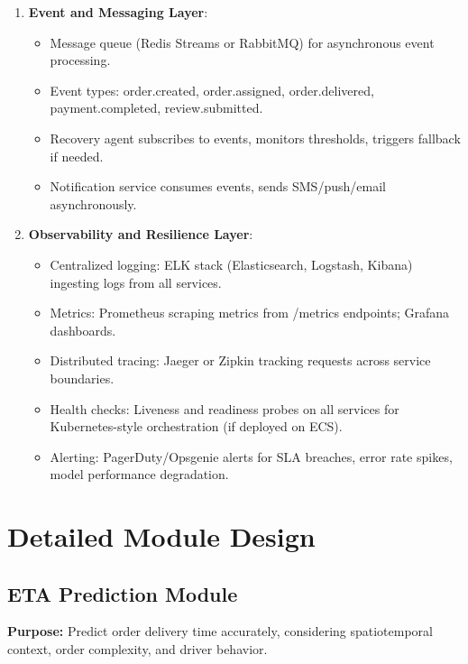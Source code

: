 \documentclass[12pt,a4paper]{report}
\begin{document}
\begin{itemize}
\begin{enumerate}
    \item \textbf{Event and Messaging Layer}:
    \begin{itemize}
        \item Message queue (Redis Streams or RabbitMQ) for asynchronous event processing.
        \item Event types: order.created, order.assigned, order.delivered, payment.completed, review.submitted.
        \item Recovery agent subscribes to events, monitors thresholds, triggers fallback if needed.
        \item Notification service consumes events, sends SMS/push/email asynchronously.
    \end{itemize}
    
    \item \textbf{Observability and Resilience Layer}:
    \begin{itemize}
        \item Centralized logging: ELK stack (Elasticsearch, Logstash, Kibana) ingesting logs from all services.
        \item Metrics: Prometheus scraping metrics from /metrics endpoints; Grafana dashboards.
        \item Distributed tracing: Jaeger or Zipkin tracking requests across service boundaries.
        \item Health checks: Liveness and readiness probes on all services for Kubernetes-style orchestration (if deployed on ECS).
        \item Alerting: PagerDuty/Opsgenie alerts for SLA breaches, error rate spikes, model performance degradation.
    \end{itemize}
\end{enumerate}

\section{Detailed Module Design}

\subsection{ETA Prediction Module}

\textbf{Purpose:} Predict order delivery time accurately, considering spatiotemporal context, order complexity, and driver behavior.


\end{itemize}
\end{document}
